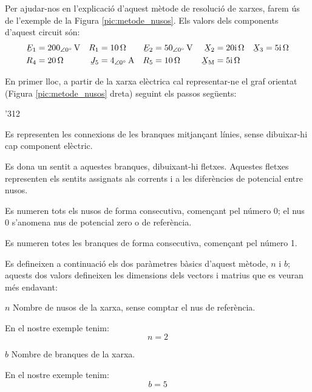 Per ajudar-nos en l'explicació d'aquest mètode de resolució de xarxes, farem
ús de l'exemple de la Figura \vref{pic:metode_nusos}. Els valors dels components d'aquest
circuit són:
\begin{align*}
   \cmplx{E}_1 &= \qtypd{200}{0}{V} & R_1 &= \qty{10}{\ohm} &
   \cmplx{E}_2 &= \qtypd{50}{0}{V}  & \cmplx{X}_2 &= \complexqty{j20}{\ohm} &
   \cmplx{X}_3 &= \complexqty{j5}{\ohm} \\
   R_4 &= \qty{20}{\ohm} & \cmplx{J}_5 &= \qtypd{4}{0}{A} &
   R_5 &= \qty{10}{\ohm} & \cmplx{X}\ped{M} &= \complexqty{j5}{\ohm}
\end{align*}

\begin{center}
\vspace{-4mm}
    
    \label{pic:metode_nusos}
\end{center}

En primer lloc, a partir de la xarxa elèctrica
cal representar-ne el graf orientat (Figura \vref{pic:metode_nusos} dreta) seguint els passos següents:
\begin{dingautolist}{'312}
   \item Es representen les connexions de les branques mitjançant línies, sense dibuixar-hi cap component elèctric.
   \item Es dona un sentit a aquestes branques, dibuixant-hi fletxes. Aquestes fletxes representen els sentits assignats als corrents i a les diferències de potencial entre nusos.
   \item Es numeren tots els nusos de forma consecutiva, començant pel número 0; el nus 0 s'anomena nus de potencial zero o de referència.
   \item Es numeren totes les branques de forma consecutiva, començant pel número 1.
\end{dingautolist}

Es defineixen a continuació els dos
paràmetres bàsics d'aquest mètode, $n$ i $b$; aquests dos valors
defineixen les dimensions dels vectors i matrius que es veuran més
endavant:
\begin{list}{}
   {\setlength{\labelwidth}{7mm} \setlength{\leftmargin}{9mm} \setlength{\labelsep}{2mm}}
   \item[$n$] Nombre de nusos de la xarxa, sense comptar el nus de referència.

   En el nostre exemple tenim:
   \[ n=2 \]

   \item[$b$] Nombre de branques de la xarxa.

   En el nostre exemple tenim:
   \[ b=5 \]
\end{list}

